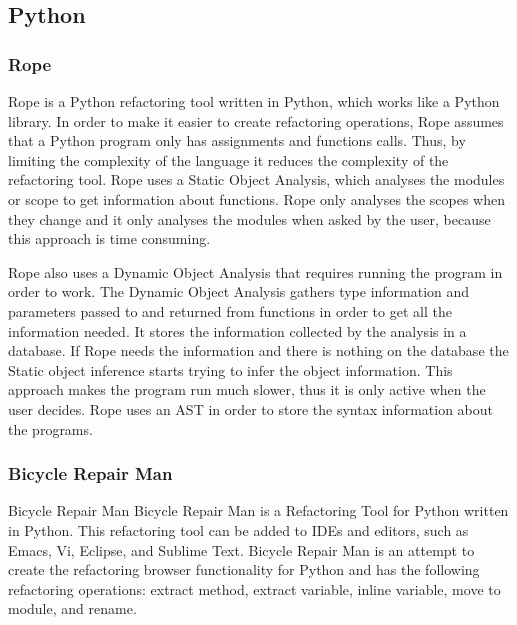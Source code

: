 \subsection{Python}

\subsubsection{Rope}
Rope\cite[p.~109]{govindaraj2015test} is a Python refactoring tool written in Python, which works like a Python library.
In order to make it easier to create refactoring operations, Rope assumes that a
Python program only has assignments and functions calls. %
Thus, by limiting the complexity of the language it reduces the complexity of the
refactoring tool.
Rope uses a Static Object Analysis, which analyses the modules or scope to get
information about functions.
Rope only analyses the scopes when they change and it only analyses the modules
when asked by the user, because this approach is time consuming.

Rope also uses a Dynamic Object Analysis that requires running
the program in order to work.
The Dynamic Object Analysis gathers type information and parameters passed to and returned from
functions in order to get all the information needed.
It stores the information collected by the analysis in a database.
If Rope needs the information and there is nothing on the database the Static
object inference starts trying to infer the object information.
This approach makes the program run much slower, thus it is only active when
the user decides.%
Rope uses an AST in order to store the syntax information about the programs.

\subsubsection{Bicycle Repair Man}
Bicycle Repair Man
Bicycle Repair Man is a Refactoring Tool for Python written in Python.
 This refactoring tool can be added to IDEs and editors, such as Emacs, Vi, Eclipse,
  and Sublime Text.
Bicycle Repair Man is an attempt to create the refactoring browser functionality for
 Python and has the following refactoring operations:
 extract method, extract variable, inline variable, move to module, and rename.

